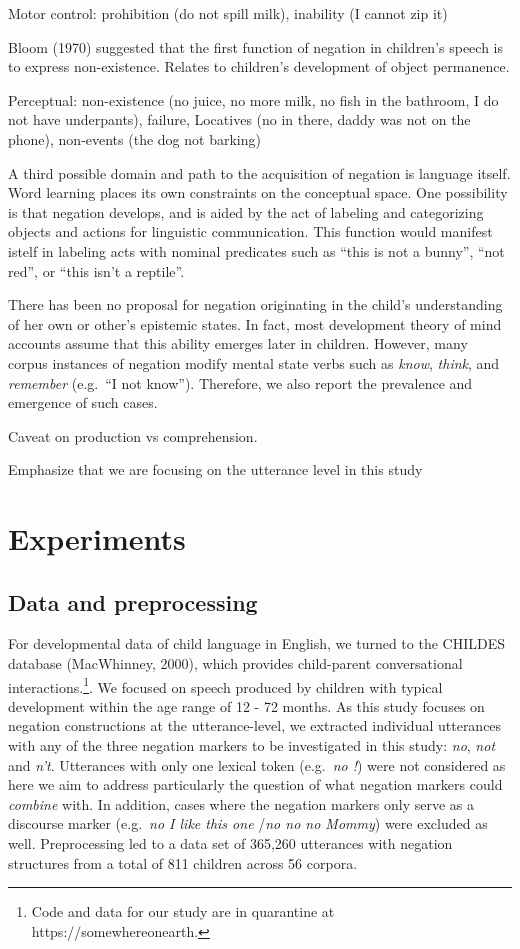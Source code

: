 \documentclass[10pt, letterpaper]{article}
\begin{document}
Motor control: prohibition (do not spill milk), inability (I cannot zip
it)

Bloom (1970) suggested that the first function of negation in children's
speech is to express non-existence. Relates to children's development of
object permanence.

Perceptual: non-existence (no juice, no more milk, no fish in the
bathroom, I do not have underpants), failure, Locatives (no in there,
daddy was not on the phone), non-events (the dog not barking)

A third possible domain and path to the acquisition of negation is
language itself. Word learning places its own constraints on the
conceptual space. One possibility is that negation develops, and is
aided by the act of labeling and categorizing objects and actions for
linguistic communication. This function would manifest istelf in
labeling acts with nominal predicates such as ``this is not a bunny'',
``not red'', or ``this isn't a reptile''.

There has been no proposal for negation originating in the child's
understanding of her own or other's epistemic states. In fact, most
development theory of mind accounts assume that this ability emerges
later in children. However, many corpus instances of negation modify
mental state verbs such as \emph{know}, \emph{think}, and
\emph{remember} (e.g.~``I not know''). Therefore, we also report the
prevalence and emergence of such cases.

Caveat on production vs comprehension.

Emphasize that we are focusing on the utterance level in this study

\hypertarget{experiments}{%
\section{Experiments}\label{experiments}}

\hypertarget{data-and-preprocessing}{%
\subsection{Data and preprocessing}\label{data-and-preprocessing}}

For developmental data of child language in English, we turned to the
CHILDES database (MacWhinney, 2000), which provides child-parent
conversational
interactions.\footnote{Code and data for our study are in quarantine at https://somewhereonearth.}.
We focused on speech produced by children with typical development
within the age range of 12 - 72 months. As this study focuses on
negation constructions at the utterance-level, we extracted individual
utterances with any of the three negation markers to be investigated in
this study: \emph{no}, \emph{not} and \emph{n't}. Utterances with only
one lexical token (e.g.~\emph{no !}) were not considered as here we aim
to address particularly the question of what negation markers could
\emph{combine} with. In addition, cases where the negation markers only
serve as a discourse marker (e.g.~\emph{no I like this one} /\emph{no no
no Mommy}) were excluded as well. Preprocessing led to a data set of
365,260 utterances with negation structures from a total of 811 children
across 56 corpora.
\end{document}
